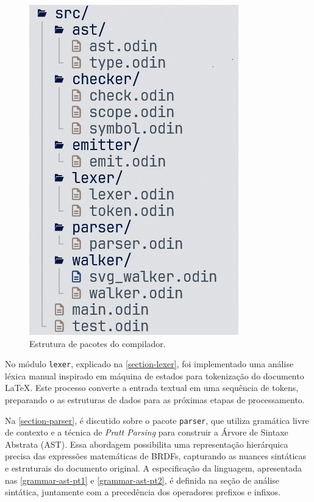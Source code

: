 \begin{figure}[!ht]
  \caption{\label{estrutura-de-pacotes} \small Estrutura de pacotes do compilador.}
  \begin{center}
    \includegraphics[scale=0.5]{./Imagens/package-structure.png}
  \end{center}
\end{figure}

No módulo \texttt{lexer}, explicado na \autoref{section-lexer}, foi implementado uma análise léxica manual inspirado em máquina de estados para tokenização do documento \LaTeX{}. Este processo converte a entrada textual em uma sequência de tokens, preparando o as estruturas de dados para as próximas etapas de processamento.


Na \autoref{section-parser}, é discutido sobre o pacote \texttt{parser}, que utiliza gramática livre de contexto e a técnica de \textit
{Pratt Parsing} para construir a Árvore de Sintaxe Abstrata (AST). Essa abordagem possibilita uma representação hierárquica precisa das expressões matemáticas de BRDFs, capturando as nuances sintáticas e estruturais do documento original. A especificação da linguagem, apresentada nas \autoref{grammar-ast-pt1} e \autoref{grammar-ast-pt2}, é definida na seção de análise sintática, juntamente com a precedência dos operadores prefixos e infixos.

